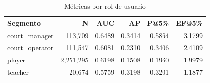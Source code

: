 \begin{table}[htbp]
\centering
\small
\caption{M\'{e}tricas por rol de usuario}
\label{tab:metrics-by-role}
\begin{tabular}{lrrrrr}
\toprule
Segmento & N & AUC & AP & P@5\% & EF@5\% \\
\midrule
  court\_manager & 113,709 & 0.6489 & 0.3414 & 0.5864 & 3.1799 \\
  court\_operator & 111,547 & 0.6081 & 0.2310 & 0.3406 & 2.4109 \\
  player & 2,251,295 & 0.6198 & 0.1508 & 0.1960 & 1.9979 \\
  teacher & 20,674 & 0.5759 & 0.3198 & 0.3201 & 1.1877 \\
\bottomrule
\end{tabular}
\end{table}
